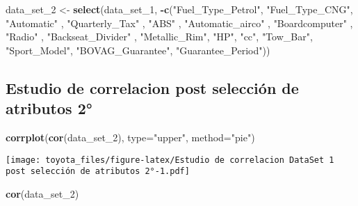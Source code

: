 \documentclass[]{article}
\newenvironment{Shaded}{\begin{snugshade}}{\end{snugshade}}
\newcommand{\DataTypeTok}[1]{\textcolor[rgb]{0.13,0.29,0.53}{#1}}
\newcommand{\DecValTok}[1]{\textcolor[rgb]{0.00,0.00,0.81}{#1}}
\newcommand{\KeywordTok}[1]{\textcolor[rgb]{0.13,0.29,0.53}{\textbf{#1}}}
\newcommand{\NormalTok}[1]{#1}
\newcommand{\OperatorTok}[1]{\textcolor[rgb]{0.81,0.36,0.00}{\textbf{#1}}}
\newcommand{\StringTok}[1]{\textcolor[rgb]{0.31,0.60,0.02}{#1}}
\begin{document}
\begin{Shaded}
\begin{Highlighting}[]
\NormalTok{data_set_}\DecValTok{2}\NormalTok{ <-}\StringTok{ }\KeywordTok{select}\NormalTok{(data_set_}\DecValTok{1}\NormalTok{, }\OperatorTok{-}\KeywordTok{c}\NormalTok{(}\StringTok{"Fuel_Type_Petrol"}\NormalTok{, }\StringTok{"Fuel_Type_CNG"}\NormalTok{, }\StringTok{"Automatic"}\NormalTok{ , }\StringTok{"Quarterly_Tax"}\NormalTok{ , }\StringTok{"ABS"}\NormalTok{ , }\StringTok{"Automatic_airco"}\NormalTok{ , }\StringTok{"Boardcomputer"}\NormalTok{ , }\StringTok{"Radio"}\NormalTok{ , }\StringTok{"Backseat_Divider"}\NormalTok{ , }\StringTok{"Metallic_Rim"}\NormalTok{, }\StringTok{"HP"}\NormalTok{, }\StringTok{"cc"}\NormalTok{, }\StringTok{"Tow_Bar"}\NormalTok{, }\StringTok{"Sport_Model"}\NormalTok{, }\StringTok{"BOVAG_Guarantee"}\NormalTok{, }\StringTok{"Guarantee_Period"}\NormalTok{))}
\end{Highlighting}
\end{Shaded}

\hypertarget{estudio-de-correlacion-post-seleccion-de-atributos-2}{%
\subsection{Estudio de correlacion post selección de atributos
2°}\label{estudio-de-correlacion-post-seleccion-de-atributos-2}}

\begin{Shaded}
\begin{Highlighting}[]
\KeywordTok{corrplot}\NormalTok{(}\KeywordTok{cor}\NormalTok{(data_set_}\DecValTok{2}\NormalTok{), }\DataTypeTok{type=}\StringTok{"upper"}\NormalTok{, }\DataTypeTok{method=}\StringTok{"pie"}\NormalTok{)}
\end{Highlighting}
\end{Shaded}

\texttt{[image: toyota\_files/figure-latex/Estudio de correlacion DataSet 1 post selección de atributos 2°-1.pdf]}

\begin{Shaded}
\begin{Highlighting}[]
\KeywordTok{cor}\NormalTok{(data_set_}\DecValTok{2}\NormalTok{)}
\end{Highlighting}
\end{Shaded}
\end{document}

